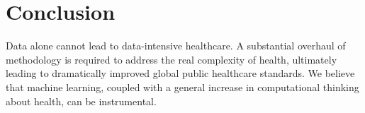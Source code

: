 \documentclass[twocolumn]{article}
\begin{document}
\section{Conclusion}
Data alone cannot lead to data-intensive healthcare. A substantial overhaul of methodology is required to address the real complexity of health, ultimately leading to dramatically improved global public healthcare standards. We believe that machine learning, coupled with a general increase in computational thinking about health, can be instrumental.



\end{document}
